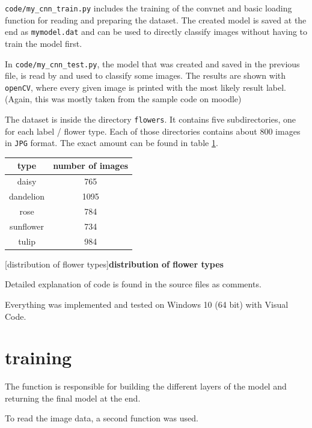 \texttt{code/my\_cnn\_train.py} includes the training of the convnet and basic loading function for reading and preparing the dataset. The created model is saved at the end as \texttt{mymodel.dat} and can be used to directly classify images without having to train the model first. 

In \texttt{code/my\_cnn\_test.py}, the model that was created and saved in the previous file, is read by  and used to classify some images. The results are shown with \texttt{openCV}, where every given image is printed with the most likely result label. (Again, this was mostly taken from the sample code on moodle)

The dataset is inside the directory \texttt{flowers}. It contains five subdirectories, one for each label / flower type. Each of those directories contains about 800 images in \texttt{JPG} format. The exact amount can be found in table \ref{tab:flower_distrib}.

\begin{table}[h]
	\centering
	\begin{tabular}{|c|c|@{}} 
		\hline
		\textbf{type}& \textbf{number of images}	
		\\ \hline
		daisy	& 765
		\\ \hline
		dandelion	& 1095		
		\\ \hline
		rose	& 784	
				\\ \hline
		sunflower	& 734
				\\ \hline
		tulip	& 984		
		\\ \hline
		
	\end{tabular}
	[distribution of flower types]{\textbf{distribution of flower types}}
	\label{tab:flower_distrib}
\end{table}

Detailed explanation of code is found in the source files as comments.

Everything was implemented and tested on Windows 10 (64 bit) with Visual Code.

\section{training}

The function  is responsible for building the different layers of the model and returning the final model at the end.

To read the image data, a second function  was used.


